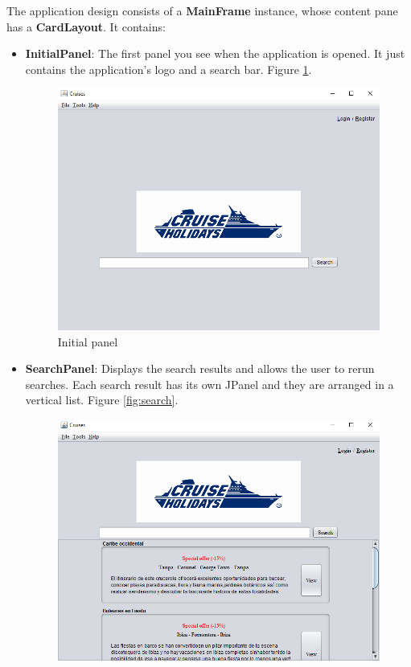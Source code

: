 \documentclass[11pt]{article}
\begin{document}
   The application design consists of a \textbf{MainFrame} instance, whose content pane has a \textbf{CardLayout}. It contains:
   \begin{itemize}
	    \item \textbf{InitialPanel}: The first panel you see when the application is opened. It just contains the application's  logo and a search bar. Figure \ref{fig:initial}.
	    \begin{figure}[h]
		   	\includegraphics[width=\linewidth]{images/initial.png}
		   	\caption{Initial panel}
		   	\label{fig:initial}
	    \end{figure}
   	    \item \textbf{SearchPanel}: Displays the search results and allows the user to rerun searches. Each search result has its own JPanel and they are arranged in a vertical list. Figure \ref{fig:search}.
   	    \begin{figure}
			\includegraphics[width=\linewidth]{images/search.png}

\end{figure}
\end{itemize}
\end{document}
